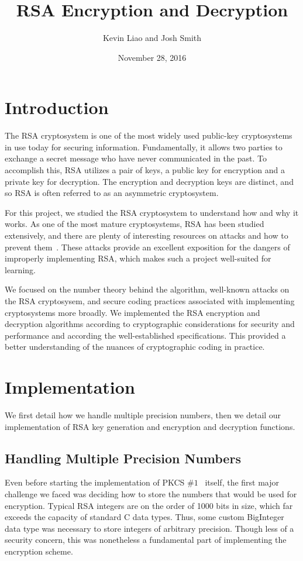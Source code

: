 \documentclass[a4paper]{article}
\title{RSA Encryption and Decryption}
\author{Kevin Liao and Josh Smith}
\date{November 28, 2016}
\begin{document}
\maketitle

\section{Introduction}
The RSA cryptosystem is one of the most widely used public-key cryptosystems in use today for securing information. Fundamentally, it allows two parties to exchange a secret message who have never communicated in the past. To accomplish this, RSA utilizes a pair of keys, a public key for encryption and a private key for decryption. The encryption and decryption keys are distinct, and so RSA is often referred to as an asymmetric cryptosystem.

For this project, we studied the RSA cryptosystem to understand how and why it works. As one of the most mature cryptosystems, RSA has been studied extensively, and there are plenty of interesting resources on attacks and how to prevent them~\cite{boneh1999twenty}. These attacks provide an excellent exposition for the dangers of improperly implementing RSA, which makes such a project well-suited for learning.

We focused on the number theory behind the algorithm, well-known attacks on the RSA cryptosysem, and secure coding practices associated with implementing cryptosystems more broadly. We implemented the RSA encryption and decryption algorithms according to cryptographic considerations for security and performance and according the well-established specifications. This provided a better understanding of the nuances of cryptographic coding in practice.

\section{Implementation}

We first detail how we handle multiple precision numbers, then we detail our implementation of RSA key generation and encryption and decryption functions.

\subsection{Handling Multiple Precision Numbers}

Even before starting the implementation of PKCS $\#1$~\cite{rsa2012pkcs} itself, the first major challenge we faced was deciding how to store the numbers that would be used for encryption. Typical RSA integers are on the order of 1000 bits in size, which far exceeds the capacity of standard C data types. Thus, some custom BigInteger data type was necessary to store integers of arbitrary precision. Though less of a security concern, this was nonetheless a fundamental part of implementing the encryption scheme.
\end{document}
